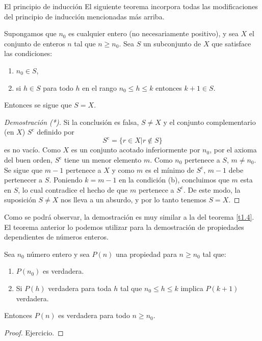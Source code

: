 \begin{section}{El principio de inducción}
El siguiente teorema incorpora todas las modificaciones del principio de inducción mencionadas más arriba.

\begin{teorema} Supongamos que $n_0$ es cualquier entero (no necesariamente positivo), y sea $X$
el conjunto de enteros $n$ tal que $ n \ge n_0$. Sea $S$ un subconjunto de $X$
que satisface las condiciones: 
\begin{enumerate}[label=(\alph*)]
\item $n_0 \in S$,
\item si $h\in S$ para todo $h$ en el rango $n_0 \le h \le k$ entonces $k+1 \in S$.
\end{enumerate}
Entonces se sigue que $S=X$.
\end{teorema}
\begin{proof}[Demostración (*)]
Si la conclusión es falsa, $S \not= X$ y
el conjunto complementario (en $X$)  $S^{\text{c}}$ definido por
$$
S^{\text{c}}= \{ r \in X | r\not\in S\}
$$
es no vacío. Como $X$ es un conjunto acotado inferiormente por $n_0$, por el axioma del buen orden, $S^{\text{c}}$ tiene un menor
elemento $m$. Como $n_0$ pertenece a $S$, $m\not=n_0$. Se sigue que
$m-1$ pertenece a $X$ y como $m$ es el mínimo de
$S^{\text{c}}$, $m-1$ debe pertenecer a $S$. Poniendo $k=m-1$ en
la condición (b), concluimos que $m$ esta en $S$, lo cual
contradice el hecho de que $m$ pertenece a $S^{\text{c}}$. De este
modo, la suposición $S \not= X$ nos lleva a un absurdo, y
por lo tanto tenemos $S= X$.
\end{proof}

Como se podrá observar, la demostración es muy similar a  la del teorema \ref{t1.4}. El teorema anterior lo podemos utilizar para la demostración de propiedades dependientes de números enteros.

\begin{teorema}\label{ind-completa} Sea $n_0$ número entero y sea $P(n)$ una propiedad para $n \ge n_0$ tal que:
\begin{enumerate}[label=(\alph*)]
\item $P(n_0)$ es verdadera.
\item Si $P(h)$ verdadera para toda $h$ tal que $n_0 \le h \le k$ implica $P(k + 1)$ verdadera.
\end{enumerate}
Entonces $P(n)$ es verdadera para todo $n \ge n_0$.
\end{teorema}
\begin{proof} Ejercicio.
\end{proof}




\end{section}
